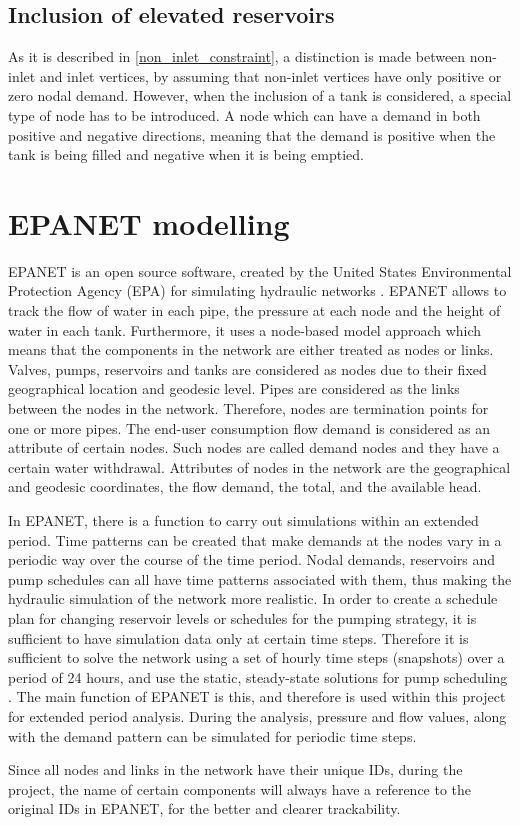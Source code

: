 \subsection{Inclusion of elevated reservoirs}
\label{inclusion_of_reservoirs}

As it is described in \eqref{non_inlet_constraint}, a distinction is made between non-inlet and inlet vertices, by assuming that non-inlet vertices have only positive or zero nodal demand. However, when the inclusion of a tank is considered, a special type of node has to be introduced. A node which can have a demand in both positive and negative directions, meaning that the demand is positive when the tank is being filled and negative when it is being emptied.



\section{EPANET modelling}
\label{EPANET_modelling}

EPANET is an open source software, created by the United States Environmental Protection Agency (EPA) for simulating hydraulic networks \cite{agency2016epanet}. EPANET allows to track the flow of water in each pipe, the pressure at each node and the height of water in each tank. Furthermore, it uses a node-based model approach which means that the components in the network are either treated as nodes or links. Valves, pumps, reservoirs and tanks are considered as nodes due to their fixed geographical location and geodesic level. Pipes are considered as the links between the nodes in the network. Therefore, nodes are termination points for one or more pipes. The end-user consumption flow demand is considered as an attribute of certain nodes. Such nodes are called demand nodes and they have a certain water withdrawal. Attributes of nodes in the network are the geographical and geodesic coordinates, the flow demand, the total, and the available head. \cite{agency2016epanet}  

In EPANET, there is a function to carry out simulations within an extended period. Time patterns can be created that make demands at the nodes vary in a periodic way over the course of the time period. Nodal demands, reservoirs and pump schedules can all have time patterns associated with them, thus making the hydraulic simulation of the network more realistic. In order to create a schedule plan for changing reservoir levels or schedules for the pumping strategy, it is sufficient to have simulation data only at certain time steps. Therefore it is sufficient to solve the network using a set of hourly time steps (snapshots) over a period of 24 hours, and use the static, steady-state solutions for pump scheduling \cite{agency2016epanet}. The main function of EPANET is this, and therefore is used within this project for extended period analysis. During the analysis, pressure and flow values, along with the demand pattern can be simulated for periodic time steps. 

Since all nodes and links in the network have their unique IDs, during the project, the name of certain components will always have a reference to the original IDs in EPANET, for the better and clearer trackability. 









